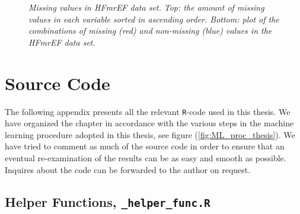 \documentclass[../thesis.tex]{subfiles}
\begin{document}
\newpage

\begin{figure}[h!]
    \centering
    \hspace*{-1cm}\resizebox{1.1\textwidth}{!}{\footnotesize}
    \caption[Missing values in HFmrEF data set]{\textit{Missing values in HFmrEF data set. Top:  the amount of missing values in each variable sorted in ascending order. Bottom: plot of the combinations of missing (red) and non-missing (blue) values in the HFmrEF data set.}}
    \label{fig:HFmrEF_missing}
\end{figure}

\newpage

\begin{figure}[h!]
\end{figure}


\chapter{Source Code}
\label{chap:souce_code}

\noindent The following appendix presents all the relevant \texttt{R}-code used in this thesis. We have organized the chapter in accordance with the various steps in the machine learning procedure adopted in this thesis, see figure (\ref{fig:ML_proc_thesis}). We have tried to comment as much of the source code in order to ensure that an eventual re-examination of the results can be as easy and smooth as possible. Inquires about the code can be forwarded to the author on request.

\section{Helper Functions, \texttt{\_helper\_func.R}}
\label{sec:helper_func}


\end{document}

